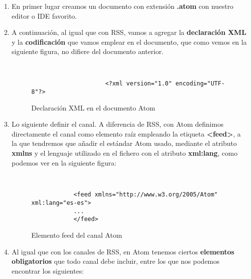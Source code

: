 \begin{enumerate}
    \item En primer lugar creamos un documento con extensión \textbf{.atom} con nuestro editor o IDE favorito.

    \item A continuación, al igual que con RSS, vamos a agregar la \textbf{declaración XML} y la \textbf{codificación} que vamos emplear en el documento, que como vemos en la siguiente figura, no difiere del documento anterior.

        \begin{figure}[H]
        \begin{tcolorbox}[sharp corners, colback=yellow!30, colframe=white!20]
            \scriptsize
            \begin{verbatim}


                     <?xml version="1.0" encoding="UTF-8"?>
            \end{verbatim}
        \end{tcolorbox}
        \caption{Declaración XML en el documento Atom}
    \end{figure}

    \item Lo siguiente definir el canal. A diferencia de RSS, con Atom definimos directamente el canal como elemento raíz empleando la etiqueta \textbf{<feed>}, a la que tendremos que añadir el estándar Atom usado, mediante el atributo \textbf{xmlns} y el lenguaje utilizado en el fichero con el atributo \textbf{xml:lang}, como podemos ver en la siguiente figura:

    \begin{figure}[h]
        \begin{tcolorbox}[sharp corners, colback=yellow!30, colframe=white!20]
            \scriptsize
            \begin{verbatim}


            <feed xmlns="http://www.w3.org/2005/Atom" xml:lang="es-es">
            ...
            </feed>
            \end{verbatim}
        \end{tcolorbox}
        \caption{Elemento feed del canal Atom}
    \end{figure}

    \item Al igual que con los canales de RSS, en Atom tenemos ciertos \textbf{elementos obligatorios} que todo canal debe incluir, entre los que nos podemos encontrar los siguientes:


\end{enumerate}
